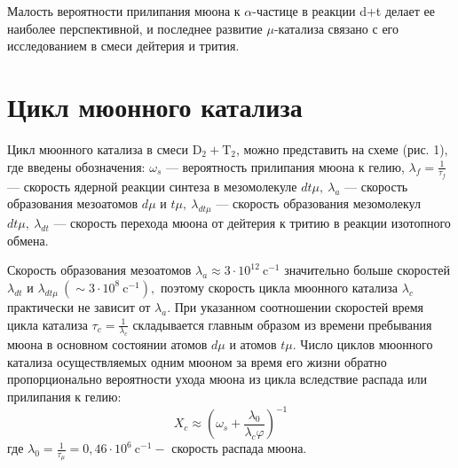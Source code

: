 \documentclass[12pt]{kiarticle} %
\begin{document}
Малость вероятности прилипания мюона к $\alpha$-частице в реакции d+t делает ее наиболее перспективной, и последнее развитие $\mu$-катализа связано с его исследованием в смеси дейтерия и трития.


\newpage 
\section{Цикл мюонного катализа}

Цикл мюонного катализа в смеси $\mathrm{D}_{2}+\mathrm{T}_{2}$, можно представить на схеме (рис. 1), где введены обозначения: $\omega_{s}$ --- вероятность прилипания мюона к гелию, $\lambda_f = \frac{1}{\tau_f} $ --- скорость ядерной реакции синтеза в мезомолекуле $d t \mu, \ \lambda_{a}$ --- скорость образования мезоатомов $d \mu$ и $t \mu, \ \lambda_{d t \mu}$ --- скорость образования мезомолекул $d t \mu, \ \lambda_{d t}$ --- скорость перехода мюона от дейтерия к тритию в реакции изотопного обмена.

Скорость образования мезоатомов $\lambda_{a} \approx 3 \cdot 10^{12} \  \text{c}^{-1}$ значительно больше скоростей $\lambda_{d t}$ и $\lambda_{d t \mu} \ \left(\sim 3 \cdot 10^{8} \  \text{c}^{-1}\right),$ поэтому скорость цикла мюонного катализа $\lambda_{c}$ практически не зависит от $\lambda_{a} .$ При указанном соотношении скоростей время цикла катализа $\tau_{c}=\frac{1}{\lambda_{c}}$ складывается главным образом из времени пребывания мюона в основном состоянии атомов $d \mu$ и атомов $t\mu$. Число циклов мюонного катализа осуществляемых одним мюоном за время его жизни обратно пропорционально вероятности ухода мюона из цикла вследствие распада или прилипания к гелию:
\begin{equation}X_{c} \approx\left(\omega_{s}+\frac{\lambda_{0}}{\lambda_{c} \varphi}\right)^{-1}
\end{equation}
где $\lambda_{0}=\frac{1}{\tau_{\mu}}=0,46 \cdot 10^{6} \ \text{c}^{-1}-$ скорость распада мюона. 
\end{document}
